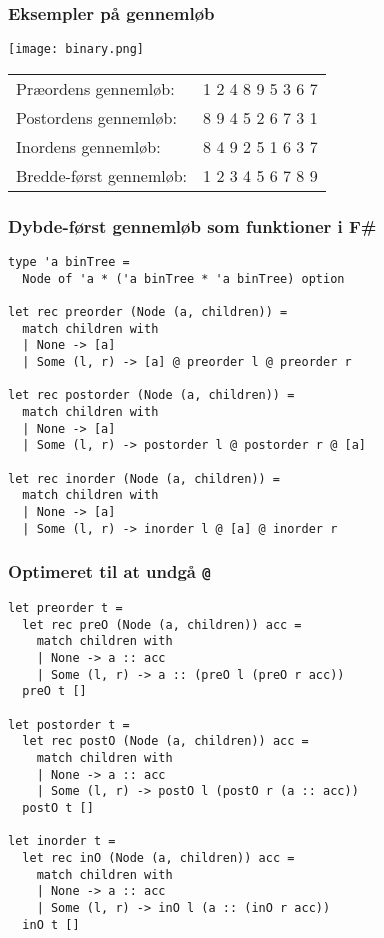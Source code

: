 \documentclass{beamer}
\begin{document}
\begin{frame}%
\frametitle{Eksempler på gennemløb}

\begin{center}
\texttt{[image: binary.png]}
\end{center}

\begin{tabular}{ll}
Præordens gennemløb: & 1 2 4 8 9 5 3 6 7\\
Postordens gennemløb: & 8 9 4 5 2 6 7 3 1 \\
Inordens gennemløb: & 8 4 9 2 5 1 6 3 7 \\
Bredde-først gennemløb: & 1 2 3 4 5 6 7 8 9
\end{tabular}

\end{frame}

\begin{frame}[fragile=singleslide]
\frametitle{Dybde-først gennemløb som funktioner i F\#}

\renewcommand{\baselinestretch}{0.9}
\begin{verbatim}
type 'a binTree =
  Node of 'a * ('a binTree * 'a binTree) option

let rec preorder (Node (a, children)) =
  match children with
  | None -> [a]
  | Some (l, r) -> [a] @ preorder l @ preorder r 

let rec postorder (Node (a, children)) =
  match children with
  | None -> [a]
  | Some (l, r) -> postorder l @ postorder r @ [a]

let rec inorder (Node (a, children)) =
  match children with
  | None -> [a]
  | Some (l, r) -> inorder l @ [a] @ inorder r
\end{verbatim}

\end{frame}

\begin{frame}[fragile=singleslide]
\frametitle{Optimeret til at undgå \texttt{@}}

\renewcommand{\baselinestretch}{0.82}

\begin{verbatim}
let preorder t =
  let rec preO (Node (a, children)) acc =
    match children with
    | None -> a :: acc
    | Some (l, r) -> a :: (preO l (preO r acc))
  preO t []

let postorder t =
  let rec postO (Node (a, children)) acc =
    match children with
    | None -> a :: acc
    | Some (l, r) -> postO l (postO r (a :: acc))
  postO t []

let inorder t =
  let rec inO (Node (a, children)) acc =
    match children with
    | None -> a :: acc
    | Some (l, r) -> inO l (a :: (inO r acc))
  inO t []
\end{verbatim}

\end{frame}
\end{document}

